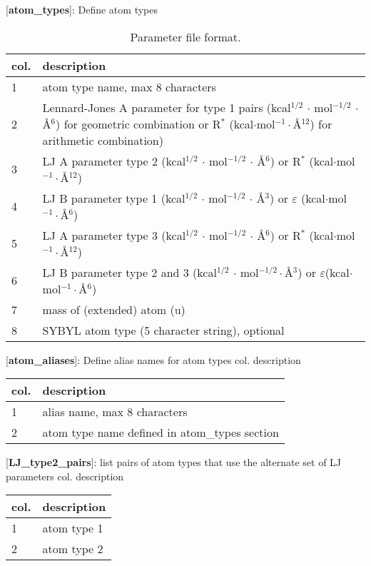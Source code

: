\documentclass[a4paper,10pt]{article}
\begin{document}
\small
\begin{table}[h]
\caption{Parameter file format.} \label{tab:prm_f_f}
[\textbf{atom\_types}]: Define atom types \\
\begin{tabularx}{\textwidth}{|l|X|}
\hline \bf{col.} & \bf{description} \\
\hline 1 & atom type name, max 8 characters \\
\hline 2 &  Lennard-Jones A parameter for type 1 pairs (kcal$^{1/2}$ $\cdot$ mol$^{-1/2}$ $\cdot$ \AA$^{6}$)
for geometric combination or R$^*$ (kcal$\cdot$mol$^{-1}\cdot$\AA$^{12}$) for arithmetic combination) \\
\hline 3 & LJ A parameter type 2 (kcal$^{1/2}$ $\cdot$ mol$^{-1/2}$ $\cdot$ \AA$^{6}$) or R$^*$ (kcal$\cdot$mol$^{-1}\cdot$\AA$^{12}$)\\
\hline 4 &  LJ B parameter type 1 (kcal$^{1/2}$ $\cdot$ mol$^{-1/2}$ $\cdot$ \AA$^{3}$) or $\varepsilon$ (kcal$\cdot$mol$^{-1}\cdot$\AA$^{6}$)\\
\hline 5 & LJ A parameter type 3 (kcal$^{1/2}$ $\cdot$ mol$^{-1/2}$ $\cdot$ \AA$^{6}$) or R$^*$ (kcal$\cdot$mol$^{-1}\cdot$\AA$^{12}$)\\
\hline 6  & LJ B parameter type 2 and 3 (kcal$^{1/2}$ $\cdot$ mol$^{-1/2}\cdot$\AA$^{3}$) or $\varepsilon$(kcal$\cdot$mol$^{-1}\cdot$\AA$^{6}$)\\
\hline 7 & mass of (extended) atom (u) \\
\hline 8  & SYBYL atom type (5 character string), optional\\
\hline
\end{tabularx}
\end{table}

[\textbf{atom\_aliases}]: Define alias names for atom types col. description \\
\begin{tabularx}{\textwidth}{|l|X|}
\hline \bf{col.} & \bf{description} \\
\hline 1  & alias name, max 8 characters \\
\hline 2 & atom type name defined in atom\_types section \\
\hline
\end{tabularx}

[\textbf{LJ\_type2\_pairs}]: list pairs of atom types that use the
alternate set of LJ parameters col. description \\
\begin{tabularx}{\textwidth}{|l|X|}
\hline \bf{col.} & \bf{description} \\
\hline 1  & atom type 1 \\
\hline 2 &atom type 2 \\
\hline
\end{tabularx}
\end{document}
